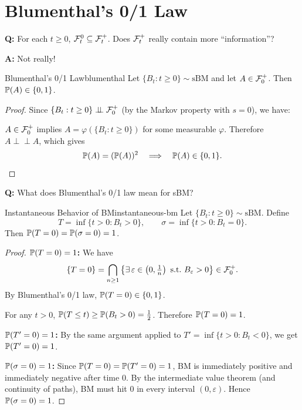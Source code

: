 \section{Blumenthal's 0/1 Law}

\textbf{Q:} For each $t \geq 0$, $\mathcal{F}_t^0 \subseteq \mathcal{F}_t^+$. Does $\mathcal{F}_t^+$ really contain more ``information''?

\noindent\textbf{A:} Not really!

\begin{theorem}{Blumenthal's 0/1 Law}{blumenthal}
    Let $\{B_t : t \geq 0\} \sim \mathrm{sBM}$ and let $A \in \mathcal{F}_0^+$. Then $\mathbb{P}(A) \in \{0, 1\}$.
\end{theorem}

\begin{proof}
    Since $\{B_t : t \geq 0\} \perp\!\!\!\perp \mathcal{F}_0^+$ (by the Markov property with $s = 0$), we have:

    $A \in \mathcal{F}_0^+$ implies $A = \varphi(\{B_t : t \geq 0\})$ for some measurable $\varphi$. Therefore $A \perp\!\!\!\perp A$, which gives
    \[
        \mathbb{P}(A) = (\mathbb{P}(A))^2 \quad \Longrightarrow \quad \mathbb{P}(A) \in \{0, 1\}. \qedhere
    \]
\end{proof}

\textbf{Q:} What does Blumenthal's 0/1 law mean for sBM?

\begin{lemma}{Instantaneous Behavior of BM}{instantaneous-bm}
    Let $\{B_t : t \geq 0\} \sim \mathrm{sBM}$. Define
    \[
        T = \inf\{t > 0 : B_t > 0\}, \qquad \sigma = \inf\{t > 0 : B_t = 0\}.
    \]
    Then $\mathbb{P}(T = 0) = \mathbb{P}(\sigma = 0) = 1$.
\end{lemma}

\begin{proof}
    \textbf{$\mathbb{P}(T = 0) = 1$:}\; We have
    \[
        \{T = 0\} = \bigcap_{n \geq 1} \left\{\exists\, \varepsilon \in \left(0, \tfrac{1}{n}\right) \text{ s.t.\ } B_\varepsilon > 0\right\} \in \mathcal{F}_0^+.
    \]
    By Blumenthal's 0/1 law, $\mathbb{P}(T = 0) \in \{0, 1\}$.

    For any $t > 0$, $\mathbb{P}(T \leq t) \geq \mathbb{P}(B_t > 0) = \frac{1}{2}$. Therefore $\mathbb{P}(T = 0) = 1$.

    \medskip
    \textbf{$\mathbb{P}(T' = 0) = 1$:}\; By the same argument applied to $T' = \inf\{t > 0 : B_t < 0\}$, we get $\mathbb{P}(T' = 0) = 1$.

    \medskip
    \textbf{$\mathbb{P}(\sigma = 0) = 1$:}\; Since $\mathbb{P}(T = 0) = \mathbb{P}(T' = 0) = 1$, BM is immediately positive and immediately negative after time $0$. By the intermediate value theorem (and continuity of paths), BM must hit $0$ in every interval $(0, \varepsilon)$. Hence $\mathbb{P}(\sigma = 0) = 1$.
\end{proof}

